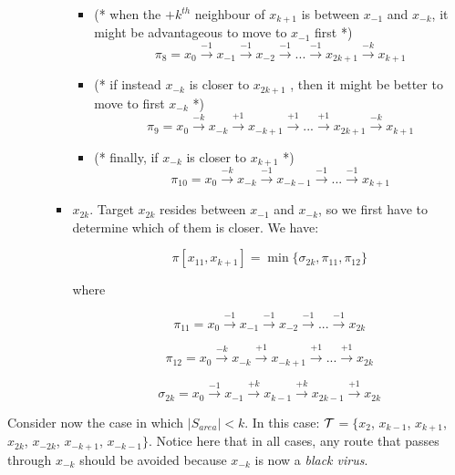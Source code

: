 \begin{itemize}
\begin{enumerate}
\begin{itemize}
\begin{itemize}
\item  (* when the $+k^{th}$ neighbour of $x_{k+1}$  is between $x_{-1}$ and $x_{-k}$, it might be advantageous to move to $x_{-1}$ first *)
   $$ \pi_8 = x_{0} \xrightarrow {-1} x_{-1} \xrightarrow {-1} x_{-2} \xrightarrow {-1} ... \xrightarrow {-1} x_{2k+1}\xrightarrow {-k} x_{k+1}$$ %
\item (*  if instead  $x_{-k}$  is closer to $x_{2k+1}$ , then  it might be better to move to first $x_{-k}$ *)
$$ \pi_9 = x_{0} \xrightarrow {-k} x_{-k} \xrightarrow {+1} x_{-k+1} \xrightarrow {+1} ... \xrightarrow {+1} x_{2k+1}\xrightarrow {-k} x_{k+1}$$ %
 \item (* finally, if $x_{-k}$  is closer to $x_{k+1}$ *)
$$ \pi_{10} = x_{0} \xrightarrow {-k} x_{-k} \xrightarrow {-1} x_{-k-1} \xrightarrow {-1} ... \xrightarrow {-1} x_{k+1}$$ %
\end{itemize}

 
\item $x_{2k}$. Target $x_{2k}$ resides   between $x_{-1}$ and $x_{-k}$, so we first have to determine which of them is closer.  We have: 

$$ \pi[x_{11},x_{k+1}] = \min \{   \sigma_{2k}, \pi_{11}, \pi_{12}\}$$

where

$$\pi_{11} = x_{0} \xrightarrow {-1} x_{-1} \xrightarrow {-1} x_{-2} \xrightarrow {-1} ... \xrightarrow {-1} x_{2k}$$ %

$$\pi_{12} =  x_{0} \xrightarrow {-k} x_{-k} \xrightarrow {+1} x_{-k+1} \xrightarrow {+1} ... \xrightarrow {+1} x_{2k}$$ %
 
$$ \sigma_{2k}=   x_{0} \xrightarrow {-1} x_{-1} \xrightarrow {+k} x_{k-1} \xrightarrow {+k} x_{2k-1}
 \xrightarrow {+1}  x_{2k}$$

\end{itemize}

\end{enumerate}

\end{itemize}


 
Consider now the case in which
  $\left\vert{S_{area}}\right\vert < k$. In this case: ${\cal T}$$=\{x_{2}$, $x_{k-1}$, $x_{k+1}$, $x_{2k}$, $x_{-2k}$, $x_{-k+1}$, $x_{-k-1}\}$.   Notice here that in all cases,  any route that passes through $x_{-k}$ should be avoided because $x_{-k}$ is now a {\it black virus}. 

